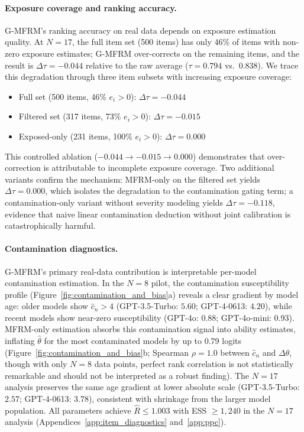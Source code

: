\paragraph{Exposure coverage and ranking accuracy.} G-MFRM's ranking accuracy on real data depends on exposure estimation quality. At $N = 17$, the full item set (500 items) has only 46\% of items with non-zero exposure estimates; G-MFRM over-corrects on the remaining items, and the result is $\Delta\tau = -0.044$ relative to the raw average ($\tau = 0.794$ vs.\ $0.838$). We trace this degradation through three item subsets with increasing exposure coverage:
%
\begin{itemize}
    \item Full set (500 items, 46\% $e_i > 0$): $\Delta\tau = -0.044$
    \item Filtered set (317 items, 73\% $e_i > 0$): $\Delta\tau = -0.015$
    \item Exposed-only (231 items, 100\% $e_i > 0$): $\Delta\tau = 0.000$
\end{itemize}
%
This controlled ablation ($-0.044 \to -0.015 \to 0.000$) demonstrates that over-correction is attributable to incomplete exposure coverage. Two additional variants confirm the mechanism: MFRM-only on the filtered set yields $\Delta\tau = 0.000$, which isolates the degradation to the contamination gating term; a contamination-only variant without severity modeling yields $\Delta\tau = -0.118$, evidence that naive linear contamination deduction without joint calibration is catastrophically harmful.

\paragraph{Contamination diagnostics.} G-MFRM's primary real-data contribution is interpretable per-model contamination estimation. In the $N = 8$ pilot, the contamination susceptibility profile (Figure~\ref{fig:contamination_and_bias}a) reveals a clear gradient by model age: older models show $\hat{c}_n > 4$ (GPT-3.5-Turbo: $5.60$; GPT-4-0613: $4.20$), while recent models show near-zero susceptibility (GPT-4o: $0.88$; GPT-4o-mini: $0.93$). MFRM-only estimation absorbs this contamination signal into ability estimates, inflating $\hat{\theta}$ for the most contaminated models by up to 0.79 logits (Figure~\ref{fig:contamination_and_bias}b; Spearman $\rho = 1.0$ between $\hat{c}_n$ and $\Delta\theta$, though with only $N = 8$ data points, perfect rank correlation is not statistically remarkable and should not be interpreted as a robust finding). The $N = 17$ analysis preserves the same age gradient at lower absolute scale (GPT-3.5-Turbo: $2.57$; GPT-4-0613: $3.78$), consistent with shrinkage from the larger model population. All parameters achieve $\hat{R} \leq 1.003$ with ESS $\geq 1{,}240$ in the $N = 17$ analysis (Appendices~\ref{app:item_diagnostics} and~\ref{app:ppc}).

